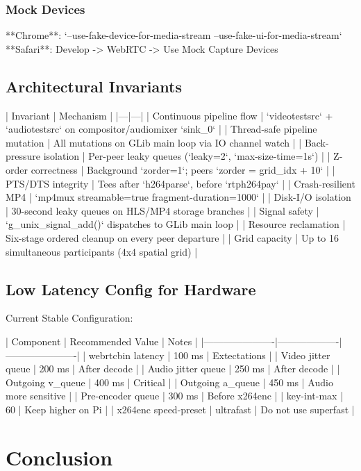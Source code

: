 \documentclass{article}
\let\originalfootnotesize\footnotesize
\let\oldverbatim\verbatim
\let\oldendverbatim\endverbatim
\renewenvironment{verbatim}{\originalfootnotesize\oldverbatim}{\oldendverbatim}
\begin{document}
\subsubsection{Mock Devices}

**Chrome**: `--use-fake-device-for-media-stream --use-fake-ui-for-media-stream`
**Safari**: Develop -> WebRTC -> Use Mock Capture Devices

\subsection{Architectural Invariants}

\begin{verbatim}
| Invariant | Mechanism |
|---|---|
| Continuous pipeline flow | `videotestsrc` + `audiotestsrc` on compositor/audiomixer `sink_0` |
| Thread-safe pipeline mutation | All mutations on GLib main loop via IO channel watch |
| Back-pressure isolation | Per-peer leaky queues (`leaky=2`, `max-size-time=1s`) |
| Z-order correctness | Background `zorder=1`; peers `zorder = grid_idx + 10` |
| PTS/DTS integrity | Tees after `h264parse`, before `rtph264pay` |
| Crash-resilient MP4 | `mp4mux streamable=true fragment-duration=1000` |
| Disk-I/O isolation | 30-second leaky queues on HLS/MP4 storage branches |
| Signal safety | `g_unix_signal_add()` dispatches to GLib main loop |
| Resource reclamation | Six-stage ordered cleanup on every peer departure |
| Grid capacity | Up to 16 simultaneous participants (4x4 spatial grid) |
\end{verbatim}

\subsection{Low Latency Config for Hardware}

Current Stable Configuration:

\begin{verbatim}
| Component            | Recommended Value | Notes                |
|----------------------|-------------------|----------------------|
| webrtcbin latency    | 100 ms            | Extectations         |
| Video jitter queue   | 200 ms            | After decode         |
| Audio jitter queue   | 250 ms            | After decode         |
| Outgoing v_queue     | 400 ms            | Critical             |
| Outgoing a_queue     | 450 ms            | Audio more sensitive |
| Pre-encoder queue    | 300 ms            | Before x264enc       |
| key-int-max          | 60                | Keep higher on Pi    |
| x264enc speed-preset | ultrafast         | Do not use superfast |
\end{verbatim}

\section{Conclusion}
\end{document}
